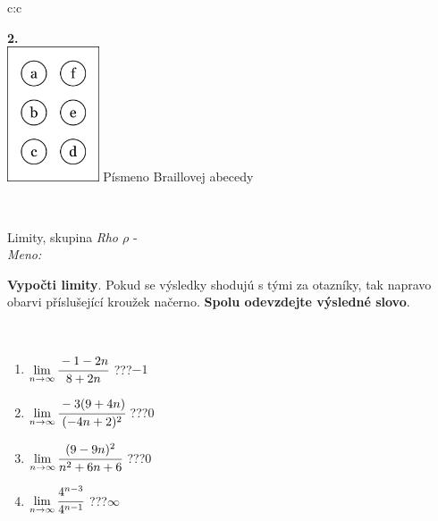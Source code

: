 \documentclass[10pt]{report}
\begin{document}
\begin{tabular}{c:c}
\begin{minipage}[c][104.5mm][t]{0.5\linewidth}
\begin{center}
\begin{minipage}{0.20\linewidth}
\begin{center}
{\Huge\bfseries 2.} \\[2mm]
\includegraphics[height=40mm]{../images/braille.png}
{\small Písmeno Braillovej abecedy}
\end{center}
\end{minipage}
\end{center}
\end{minipage}
\\ \hdashline
\begin{minipage}[c][104.5mm][t]{0.5\linewidth}
\begin{center}
\vspace{7mm}
{\huge Limity, skupina \textit{Rho $\rho$} -}\\[5mm]
\textit{Meno:}\phantom{xxxxxxxxxxxxxxxxxxxxxxxxxxxxxxxxxxxxxxxxxxxxxxxxxxxxxxxxxxxxxxxxx}\\[5mm]
\begin{minipage}{0.95\linewidth}
\begin{center}
\textbf{Vypočti limity}. Pokud se výsledky shodujú s tými za otazníky, tak napravo\\obarvi příslušející kroužek načerno. \textbf{Spolu odevzdejte výsledné slovo}.
\end{center}
\end{minipage}
\\[1mm]
\begin{minipage}{0.79\linewidth}
\begin{center}
\begin{varwidth}{\linewidth}
\begin{enumerate}
\normalsize
\item $\lim\limits_{n\to\infty}\cfrac{-1-2n}{8+2n}$\quad \dotfill\; ???\;\dotfill \quad $-1$
\item $\lim\limits_{n\to\infty}\cfrac{-3(9+4n)}{(-4n+2)^2}$\quad \dotfill\; ???\;\dotfill \quad $0$
\item $\lim\limits_{n\to\infty}\cfrac{(9-9n)^2}{n^2+6n+6}$\quad \dotfill\; ???\;\dotfill \quad $0$
\item $\lim\limits_{n\to\infty}\cfrac{4^{n-3}}{4^{n-1}}$\quad \dotfill\; ???\;\dotfill \quad $\infty$

\end{enumerate}
\end{varwidth}
\end{center}
\end{minipage}
\end{center}
\end{minipage}
\end{tabular}
\end{document}
